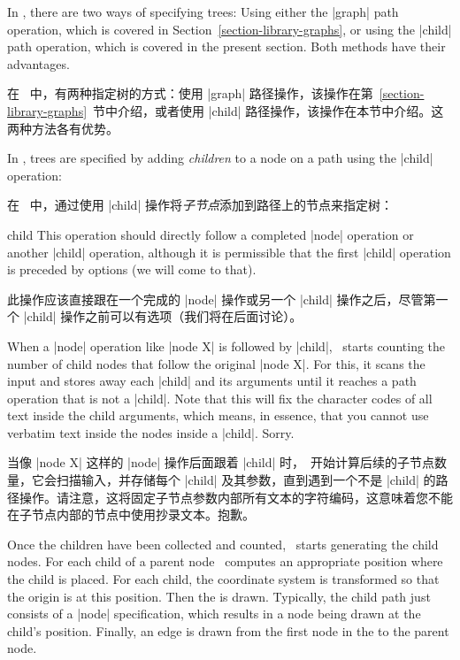 In \tikzname, there are two ways of specifying trees: Using either the |graph|
path operation, which is covered in Section~\ref{section-library-graphs}, or
using the |child| path operation, which is covered in the present section. Both
methods have their advantages.

在 \tikzname\ 中，有两种指定树的方式：使用 |graph| 路径操作，该操作在第~\ref{section-library-graphs}~节中介绍，或者使用 |child| 路径操作，该操作在本节中介绍。这两种方法各有优势。

In \tikzname, trees are specified by adding \emph{children} to a node on a path
using the |child| operation:

在 \tikzname\ 中，通过使用 |child| 操作将\emph{子节点}添加到路径上的节点来指定树：

\begin{pathoperation}{child}{
        }
    This operation should directly follow a completed |node| operation or
    another |child| operation, although it is permissible that the first
    |child| operation is preceded by options (we will come to that).

    此操作应该直接跟在一个完成的 |node| 操作或另一个 |child| 操作之后，尽管第一个 |child| 操作之前可以有选项（我们将在后面讨论）。

    When a |node| operation like |node {X}| is followed by |child|, \tikzname\
    starts counting the number of child nodes that follow the original
    |node {X}|. For this, it scans the input and stores away each |child| and
    its arguments until it reaches a path operation that is not a |child|. Note
    that this will fix the character codes of all text inside the child
    arguments, which means, in essence, that you cannot use verbatim text
    inside the nodes inside a |child|. Sorry.

    当像 |node {X}| 这样的 |node| 操作后面跟着 |child| 时，\tikzname\ 开始计算后续的子节点数量，它会扫描输入，并存储每个 |child| 及其参数，直到遇到一个不是 |child| 的路径操作。请注意，这将固定子节点参数内部所有文本的字符编码，这意味着您不能在子节点内部的节点中使用抄录文本。抱歉。

    Once the children have been collected and counted, \tikzname\ starts
    generating the child nodes. For each child of a parent node \tikzname\
    computes an appropriate position where the child is placed. For each child,
    the coordinate system is transformed so that the origin is at this
    position. Then the \meta{child path} is drawn. Typically, the child path
    just consists of a |node| specification, which results in a node being
    drawn at the child's position. Finally, an edge is drawn from the first
    node in the \meta{child path} to the parent node.


\end{pathoperation}
